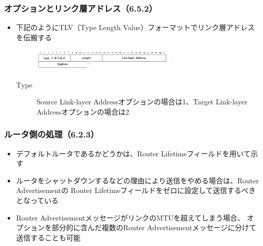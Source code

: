 \begin{frame}
  \frametitle{オプションとリンク層アドレス（6.5.2）}

  \begin{itemize}
    \item 下記のようにTLV（Type Length Value）フォーマットでリンク層アドレスを伝搬する
    \begin{center}
      \begin{figure}
        \includegraphics[width=0.65\textwidth]{img/figure6_9.png}
      \end{figure}
    \end{center}
    \begin{description}
      \item[Type] Source Link-layer Addressオプションの場合は1、Target Link-layer Addressオプションの場合は2      
    \end{description}
  \end{itemize}
\end{frame}

\begin{frame}
  \frametitle{ルータ側の処理（6.2.3）}

  \begin{itemize}
    \item デフォルトルータであるかどうかは、Router Lifetimeフィールドを用いて示す

    \item ルータをシャットダウンするなどの理由により送信をやめる場合は、Router Advertisementの
    Router Lifetimeフィールドをゼロに設定して送信するべきとなっている
    
    \item Router AdvertisementメッセージがリンクのMTUを超えてしまう場合、
    オプションを部分的に含んだ複数のRouter Advertisementメッセージに分けて送信することも可能
  \end{itemize}  
\end{frame}

